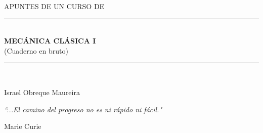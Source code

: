 \documentclass[paper=a4, fontsize=11pt,twoside]{scrartcl}
\begin{document}



\begin{titlepage}

\begin{center}
\vspace*{-1in}
\begin{figure}[htb]
\begin{center}
\end{center}
\end{figure}


\vspace*{0.15in}

\vspace*{0.6in}
\begin{large}
APUNTES DE UN CURSO DE 
\end{large}
\vspace*{0.2in}
\begin{Large}

\rule{120mm}{0.1mm}\\
\vspace*{0.3in}
\textbf{ MEC\'ANICA CL\'ASICA I} \\
\vspace*{0.2in}
(Cuaderno en bruto)
\end{Large}
\vspace*{0.3in}


\rule{115mm}{0.1mm}\\
\vspace*{0.1in}
\vspace*{0.5in}

\begin{large}
Israel Obreque Maureira
\end{large}

\vspace*{4in}

\emph{\textquotedblleft ...El camino del progreso no es ni r\'apido ni f\'acil."}

\begin{flushright}
Marie Curie
\end{flushright}

\begin{large}

\end{large}
\end{center}

\end{titlepage}

\tableofcontents
\end{document}
